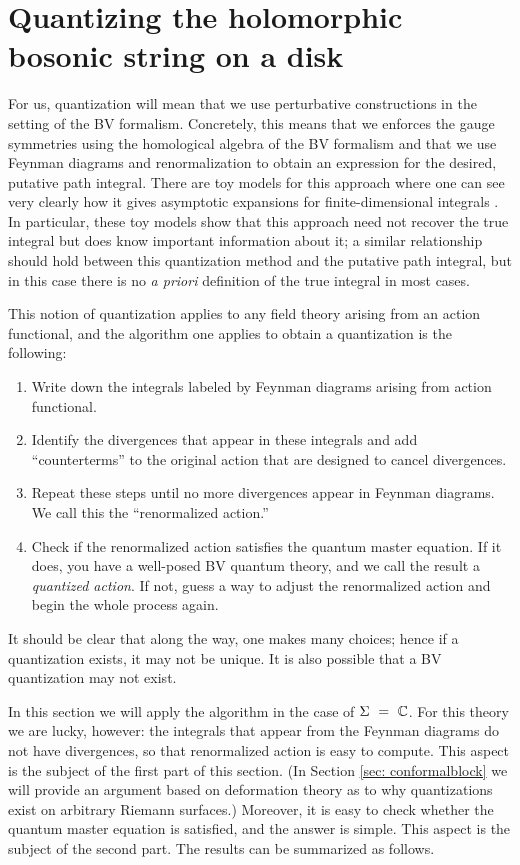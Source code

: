 \section{Quantizing the holomorphic bosonic string on a disk} 
\label{sec: quantization}

For us, quantization will mean that we use perturbative constructions in the setting of the BV formalism.
Concretely, this means that we enforces the gauge symmetries using the homological algebra of the BV formalism 
and that we use Feynman diagrams and renormalization to obtain an expression for the desired, putative path integral. 
There are toy models for this approach where one can see very clearly how it gives asymptotic expansions for finite-dimensional integrals .
In particular, these toy models show that this approach need not recover the true integral
but does know important information about it;
a similar relationship should hold between this quantization method and the putative path integral, 
but in this case there is no {\em a priori} definition of the true integral in most cases.

This notion of quantization applies to any field theory arising from an action functional,
and the algorithm one applies to obtain a quantization is the following:
\begin{enumerate}
\item Write down the integrals labeled by Feynman diagrams arising from action functional.
\item Identify the divergences that appear in these integrals and add ``counterterms'' to the original action that are designed to cancel divergences.
\item Repeat these steps until no more divergences appear in Feynman diagrams.
We call this the ``renormalized action.''
\item Check if the renormalized action satisfies the quantum master equation. 
If it does, you have a well-posed BV quantum theory, and we call the result a {\em quantized action}. If not, guess a way to adjust the renormalized action and begin the whole process again.
\end{enumerate}
It should be clear that along the way, one makes many choices;
hence if a quantization exists, it may not be unique.
It is also possible that a BV quantization may not exist.

In this section we will apply the algorithm in the case of $\Sigma~=~\mathbb C$.
For this theory we are lucky, however:
the integrals that appear from the Feynman diagrams do not have divergences,
so that renormalized action is easy to compute.
This aspect is the subject of the first part of this section.
(In Section \ref{sec: conformalblock} we will provide an argument based on deformation theory as to why quantizations exist on arbitrary Riemann surfaces.)
Moreover, it is easy to check whether the quantum master equation is satisfied,
and the answer is simple.
This aspect is the subject of the second part.
The results can be summarized as follows.

